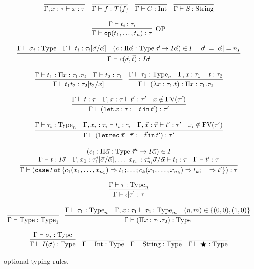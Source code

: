 \documentclass[
    9pt,            %
    techreport,        %
    affiltop,       %
]{art}
\begin{document}
\begin{figure}[H]
\[
\begin{array}{c}
\infer{\Gamma, x : \tau \proves x : \tau}{}\quad
\infer{\Gamma \proves f : \Tc(f)}{}\quad
\infer{\Gamma \proves C : \Int}{}\quad
\infer{\Gamma \proves S : \String}{}
\\ \\
\infer[\mathrm{OP}]{\Gamma \proves \op(t_1,\ldots,t_n) : \tau}{\Gamma \proves t_i : \tau_i}
\\ \\
\infer{\Gamma \proves c(\vec{\sigma},\vec{t}) : I \vec{\sigma}}{\Gamma \proves \sigma_i : \Type & \Gamma \proves t_i : \tau_i[\vec{\sigma}/\vec{\alpha}] & (c : \Pi \vec{\alpha} : \Type . \vec{\tau} \to I \vec{\alpha}) \in I & |\vec{\sigma}| = |\vec{\alpha}| = n_I}
\\ \\
\infer{\Gamma \proves t_1 t_2 : \tau_2[t_2/x]}{\Gamma \proves t_1 : \Pi x : \tau_1 . \tau_2 & \Gamma \proves t_2 : \tau_1}\quad
\infer{\Gamma \proves (\lambda x : \tau_1 . t) : \Pi x : \tau_1 . \tau_2}{\Gamma \proves \tau_1 : \Type_n & \Gamma, x : \tau_1 \proves t : \tau_2}
\\ \\
\infer{\Gamma \proves (\slet{x : \tau := t}{t'}) : \tau'}{\Gamma \proves t : \tau & \Gamma, x : \tau \proves t' : \tau' & x \notin \FV(\tau')}
\\ \\
\infer{\Gamma \proves (\sletrec{\vec{x} : \vec{\tau} := \vec{t}}{t'}) : \tau'}{\Gamma \proves \tau_i : \Type_n & \Gamma, x_i : \tau_i \proves t_i : \tau_i & \Gamma, \vec{x} : \vec{\tau} \proves t' : \tau' & x_i \notin \FV(\tau')}
\\ \\
\infer{\Gamma \proves (\scase{t}{\{c_1(x_1,\ldots,x_{n_1}) \To t_1; \ldots; c_k(x_1,\ldots,x_{n_k}) \To t_k; \_ \To t'\}}) : \tau}{\multicolumn{3}{c}{(c_i : \Pi \vec{\alpha} : \Type . \vec{\tau}^i \to I\vec{\alpha}) \in I}\\ \Gamma \proves t : I \vec{\sigma} & \Gamma, x_1 : \tau_1^i[\vec{\sigma}/\vec{\alpha}], \ldots, x_{n_i} : \tau_{n_i}^i\vec{\sigma}/\vec{\alpha} \proves t_i : \tau & \Gamma \proves t' : \tau}
\\ \\
\infer{\Gamma \proves \epsilon[\tau] : \tau}{\Gamma \proves \tau : \Type_n}
\\ \\
\infer{\Gamma \proves \Type : \Type_1}{}\quad
\infer{\Gamma \proves (\Pi x : \tau_1 . \tau_2) : \Type}{\Gamma \proves \tau_1 : \Type_n & \Gamma, x : \tau_1 \proves \tau_2 : \Type_m & (n,m) \in \{(0,0), (1,0)\}}
\\ \\
\infer{\Gamma \proves I(\vec{\sigma}) : \Type}{\Gamma \proves \sigma_i : \Type}\quad
\infer{\Gamma \proves \Int : \Type}{}\quad
\infer{\Gamma \proves \String : \Type}{}\quad
\infer{\Gamma \proves \Dynamic : \Type}{}
\end{array}
\]
\caption{\JuvixCore{} optional typing rules.}
\label{fig:typing}
\end{figure}
\end{document}
